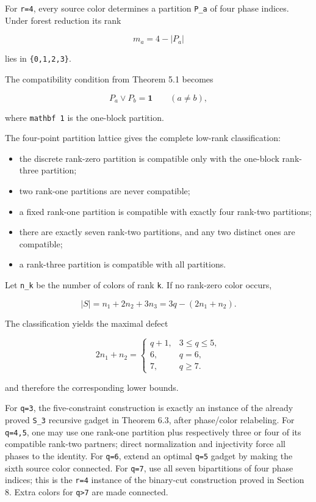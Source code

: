 For \texttt{r=4}, every source color determines a partition
\texttt{P\_a} of four phase indices. Under forest reduction its rank

\[
m_a=4-|P_a|
\]

lies in \texttt{\{0,1,2,3\}}.

The compatibility condition from Theorem 5.1 becomes

\[
P_a\vee P_b=\mathbf 1
\qquad(a\ne b),
\tag{28}
\]

where \texttt{mathbf\ 1} is the one-block partition.

The four-point partition lattice gives the complete low-rank
classification:

\begin{itemize}
\tightlist
\item
  the discrete rank-zero partition is compatible only with the one-block
  rank-three partition;
\item
  two rank-one partitions are never compatible;
\item
  a fixed rank-one partition is compatible with exactly four rank-two
  partitions;
\item
  there are exactly seven rank-two partitions, and any two distinct ones
  are compatible;
\item
  a rank-three partition is compatible with all partitions.
\end{itemize}

Let \texttt{n\_k} be the number of colors of rank \texttt{k}. If no
rank-zero color occurs,

\[
|S|=n_1+2n_2+3n_3=3q-(2n_1+n_2).
\tag{29}
\]

The classification yields the maximal defect

\[
2n_1+n_2=\begin{cases}
q+1,&3\le q\le5,\\
6,&q=6,\\
7,&q\ge7.
\end{cases}
\tag{30}
\]

and therefore the corresponding lower bounds.

For \texttt{q=3}, the five-constraint construction is exactly an
instance of the already proved \texttt{S\_3} recursive gadget in Theorem
6.3, after phase/color relabeling. For \texttt{q=4,5}, one may use one
rank-one partition plus respectively three or four of its compatible
rank-two partners; direct normalization and injectivity force all phases
to the identity. For \texttt{q=6}, extend an optimal \texttt{q=5} gadget
by making the sixth source color connected. For \texttt{q=7}, use all
seven bipartitions of four phase indices; this is the \texttt{r=4}
instance of the binary-cut construction proved in Section 8. Extra
colors for \texttt{q\textgreater{}7} are made connected.

